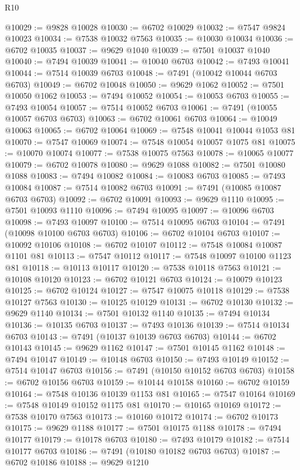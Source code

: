 \begin{lexlean}{R10}
\begin{coremodule}
@10029 := @9828 @10028
@10030 := @6702 @10029
@10032 := @7547 @9824 @10023
@10034 := @7538 @10032 @7563
@10035 := @10030 @10034
@10036 := @6702 @10035
@10037 := @9629 @1040
@10039 := @7501 @10037 @1040
@10040 := @7494 @10039
@10041 := @10040 @6703
@10042 := @7493 @10041
@10044 := @7514 @10039 @6703
@10048 := @7491 (@10042 @10044 @6703 @6703)
@10049 := @6702 @10048
@10050 := @9629 @1062
@10052 := @7501 @10050 @1062
@10053 := @7494 @10052
@10054 := @10053 @6703
@10055 := @7493 @10054
@10057 := @7514 @10052 @6703
@10061 := @7491 (@10055 @10057 @6703 @6703)
@10063 := @6702 @10061 @6703
@10064 := @10049 @10063
@10065 := @6702 @10064
@10069 := @7548 @10041 @10044 @1053 @81
@10070 := @7547 @10069
@10074 := @7548 @10054 @10057 @1075 @81
@10075 := @10070 @10074
@10077 := @7538 @10075 @7563
@10078 := @10065 @10077
@10079 := @6702 @10078
@10080 := @9629 @1088
@10082 := @7501 @10080 @1088
@10083 := @7494 @10082
@10084 := @10083 @6703
@10085 := @7493 @10084
@10087 := @7514 @10082 @6703
@10091 := @7491 (@10085 @10087 @6703 @6703)
@10092 := @6702 @10091
@10093 := @9629 @1110
@10095 := @7501 @10093 @1110
@10096 := @7494 @10095
@10097 := @10096 @6703
@10098 := @7493 @10097
@10100 := @7514 @10095 @6703
@10104 := @7491 (@10098 @10100 @6703 @6703)
@10106 := @6702 @10104 @6703
@10107 := @10092 @10106
@10108 := @6702 @10107
@10112 := @7548 @10084 @10087 @1101 @81
@10113 := @7547 @10112
@10117 := @7548 @10097 @10100 @1123 @81
@10118 := @10113 @10117
@10120 := @7538 @10118 @7563
@10121 := @10108 @10120
@10123 := @6702 @10121 @6703
@10124 := @10079 @10123
@10125 := @6702 @10124
@10127 := @7547 @10075 @10118
@10129 := @7538 @10127 @7563
@10130 := @10125 @10129
@10131 := @6702 @10130
@10132 := @9629 @1140
@10134 := @7501 @10132 @1140
@10135 := @7494 @10134
@10136 := @10135 @6703
@10137 := @7493 @10136
@10139 := @7514 @10134 @6703
@10143 := @7491 (@10137 @10139 @6703 @6703)
@10144 := @6702 @10143
@10145 := @9629 @1162
@10147 := @7501 @10145 @1162
@10148 := @7494 @10147
@10149 := @10148 @6703
@10150 := @7493 @10149
@10152 := @7514 @10147 @6703
@10156 := @7491 (@10150 @10152 @6703 @6703)
@10158 := @6702 @10156 @6703
@10159 := @10144 @10158
@10160 := @6702 @10159
@10164 := @7548 @10136 @10139 @1153 @81
@10165 := @7547 @10164
@10169 := @7548 @10149 @10152 @1175 @81
@10170 := @10165 @10169
@10172 := @7538 @10170 @7563
@10173 := @10160 @10172
@10174 := @6702 @10173
@10175 := @9629 @1188
@10177 := @7501 @10175 @1188
@10178 := @7494 @10177
@10179 := @10178 @6703
@10180 := @7493 @10179
@10182 := @7514 @10177 @6703
@10186 := @7491 (@10180 @10182 @6703 @6703)
@10187 := @6702 @10186
@10188 := @9629 @1210

\end{coremodule}
\end{lexlean}
